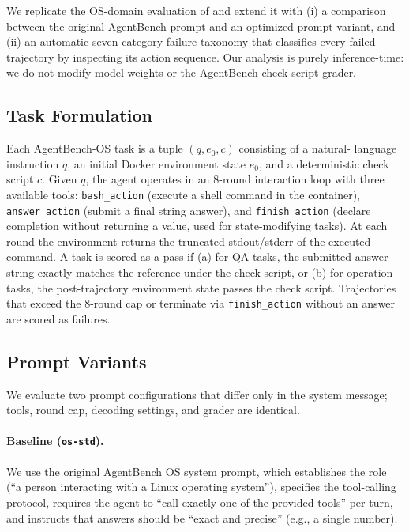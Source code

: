 \documentclass[11pt]{article}
\begin{document}
We replicate the OS-domain evaluation of \citet{liu2023agentbench} and
extend it with (i) a comparison between the original AgentBench prompt
and an optimized prompt variant, and (ii) an automatic seven-category
failure taxonomy that classifies every failed trajectory by inspecting
its action sequence. Our analysis is purely inference-time: we do not
modify model weights or the AgentBench check-script grader.

\subsection{Task Formulation}

Each AgentBench-OS task is a tuple $(q, e_0, c)$ consisting of a natural-
language instruction $q$, an initial Docker environment state $e_0$, and
a deterministic check script $c$. Given $q$, the agent operates in an
8-round interaction loop with three available tools:
\texttt{bash\_action} (execute a shell command in the container),
\texttt{answer\_action} (submit a final string answer), and
\texttt{finish\_action} (declare completion without returning a value,
used for state-modifying tasks). At each round the environment returns
the truncated stdout/stderr of the executed command. A task is scored
as a pass if (a) for QA tasks, the submitted answer string exactly
matches the reference under the check script, or (b) for operation
tasks, the post-trajectory environment state passes the check script.
Trajectories that exceed the 8-round cap or terminate via
\texttt{finish\_action} without an answer are scored as failures.

\subsection{Prompt Variants}
\label{sec:prompt_variants}

We evaluate two prompt configurations that differ only in the system
message; tools, round cap, decoding settings, and grader are identical.

\paragraph{Baseline (\texttt{os-std}).}
We use the original AgentBench OS system prompt, which establishes the
role (``a person interacting with a Linux operating system''), specifies
the tool-calling protocol, requires the agent to ``call exactly one of
the provided tools'' per turn, and instructs that answers should be
``exact and precise'' (e.g., a single number).
\end{document}
